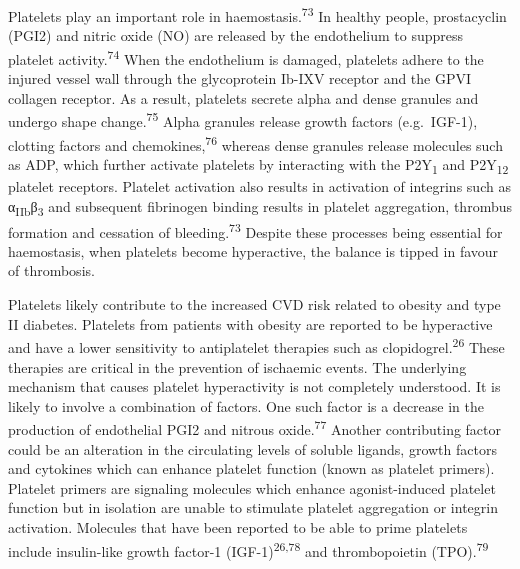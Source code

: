 \documentclass[11pt,twoside]{bristolthesis}
\begin{document}
Platelets play an important role in haemostasis.\textsuperscript{73} In healthy people, prostacyclin (PGI2) and nitric oxide (NO) are released by the endothelium to suppress platelet activity.\textsuperscript{74} When the endothelium is damaged, platelets adhere to the injured vessel wall through the glycoprotein Ib-IXV receptor and the GPVI collagen receptor. As a result, platelets secrete alpha and dense granules and undergo shape change.\textsuperscript{75} Alpha granules release growth factors (e.g.~IGF-1), clotting factors and chemokines,\textsuperscript{76} whereas dense granules release molecules such as ADP, which further activate platelets by interacting with the P2Y\textsubscript{1} and P2Y\textsubscript{12} platelet receptors. Platelet activation also results in activation of integrins such as α\textsubscript{IIb}β\textsubscript{3} and subsequent fibrinogen binding results in platelet aggregation, thrombus formation and cessation of bleeding.\textsuperscript{73} Despite these processes being essential for haemostasis, when platelets become hyperactive, the balance is tipped in favour of thrombosis.

Platelets likely contribute to the increased CVD risk related to obesity and type II diabetes. Platelets from patients with obesity are reported to be hyperactive and have a lower sensitivity to antiplatelet therapies such as clopidogrel.\textsuperscript{26} These therapies are critical in the prevention of ischaemic events. The underlying mechanism that causes platelet hyperactivity is not completely understood. It is likely to involve a combination of factors. One such factor is a decrease in the production of endothelial PGI2 and nitrous oxide.\textsuperscript{77} Another contributing factor could be an alteration in the circulating levels of soluble ligands, growth factors and cytokines which can enhance platelet function (known as platelet primers). Platelet primers are signaling molecules which enhance agonist-induced platelet function but in isolation are unable to stimulate platelet aggregation or integrin activation. Molecules that have been reported to be able to prime platelets include insulin-like growth factor-1 (IGF-1)\textsuperscript{26,78} and thrombopoietin (TPO).\textsuperscript{79}
\end{document}
